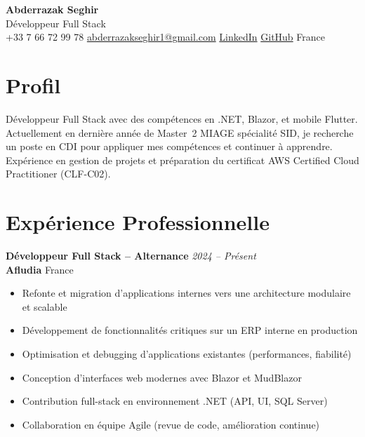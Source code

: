 \documentclass[a4paper,10pt]{article}
\begin{document}
\begin{center}
    {\LARGE\bfseries\color{darktext} Abderrazak Seghir} \\[0.3em]
    {\large\color{primary} Développeur Full Stack} \\[0.4em]
    {\small\color{graytext}
         +33 7 66 72 99 78 \quad
         \href{mailto:abderrazakseghir1@gmail.com}{abderrazakseghir1@gmail.com} \quad
         \href{https://www.linkedin.com/in/seghir-abderrazak-248520229/}{LinkedIn} \quad
         \href{https://github.com/abderrzakseghir}{GitHub} \quad
         France
    }
\end{center}

\vspace{0.3em}

\section{Profil}
Développeur Full Stack avec des compétences en .NET, Blazor, et mobile Flutter.
Actuellement en dernière année de Master~2 MIAGE spécialité SID, je recherche un poste en CDI pour appliquer mes compétences et continuer à apprendre.
Expérience en gestion de projets et préparation du certificat AWS Certified Cloud Practitioner (CLF-C02).

\section{Expérience Professionnelle}

\textbf{Développeur Full Stack -- Alternance} \hfill \textit{2024 -- Présent} \\
\textbf{Afludia} \hfill France
\begin{itemize}
    \item Refonte et migration d'applications internes vers une architecture modulaire et scalable
    \item Développement de fonctionnalités critiques sur un ERP interne en production
    \item Optimisation et debugging d'applications existantes (performances, fiabilité)
    \item Conception d'interfaces web modernes avec Blazor et MudBlazor
    \item Contribution full-stack en environnement .NET (API, UI, SQL Server)
    \item Collaboration en équipe Agile (revue de code, amélioration continue)
\end{itemize}
\end{document}
